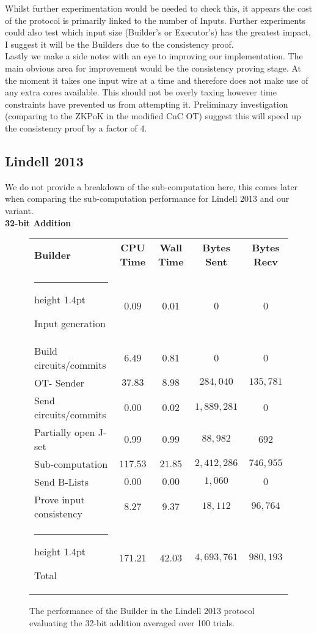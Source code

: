 \documentclass[11pt]{article} %
\makeatletter
\newcommand{\thickhline}{%
    \noalign {\ifnum 0=`}\fi \hrule height 1.4pt
    \futurelet \reserved@a \@xhline
}
\makeatother
\begin{document}
				Whilst further experimentation would be needed to check this, it appears the cost of the protocol is primarily linked to the number of Inputs. Further experiments could also test which input size (Builder's or Executor's) has the greatest impact, I suggest it will be the Builders due to the consistency proof.\\

				Lastly we make a side notes with an eye to improving our implementation. The main obvious area for improvement would be the consistency proving stage. At the moment it takes one input wire at a time and therefore does not make use of any extra cores available. This should not be overly taxing however time constraints have prevented us from attempting it. Preliminary investigation (comparing to the ZKPoK in the modified CnC OT) suggest this will speed up the consistency proof by a factor of 4.

			\pagebreak
			\subsection{Lindell 2013} \label{sub:L-2013_Results_Analysis}
				We do not provide a breakdown of the sub-computation here, this comes later when comparing the sub-computation performance for Lindell 2013 and our variant.\\

				\FloatBarrier
				\noindent \textbf{32-bit Addition}
				\begin{figure}[!ht]
					\begin{tabular}{| p{4.3cm} | c c c c |}
						\hline
						\textbf{Builder} & \textbf{CPU Time} & \textbf{Wall Time} & \textbf{Bytes Sent} & \textbf{Bytes Recv} \\
						\thickhline
						Input generation & $0.09$ & $0.01$ & $0$ & $0$ \\
						\hline
						Build circuits/commits & $6.49$ & $0.81$ & $0$ & $0$ \\
						\hline
						OT- Sender & $37.83$ & $8.98$ & $284,040$ & $135,781$ \\
						\hline
						Send circuits/commits & $0.00$ & $0.02$ & $1,889,281$ & $0$ \\
						\hline
						Partially open J-set & $0.99$ & $0.99$ & $88,982$ & $692$ \\
						\hline
						Sub-computation & $117.53$ & $21.85$ & $2,412,286$ & $746,955$ \\
						\hline
						Send B-Lists & $0.00$ & $0.00$ & $1,060$ & $0$ \\
						\hline
						Prove input consistency & $8.27$ & $9.37$ & $18,112$ & $96,764$ \\
						\thickhline
						Total & $171.21$ & $42.03$ & $4,693,761$ & $980,193$ \\
						\hline
					\end{tabular}
					\caption{The performance of the Builder in the Lindell 2013 protocol evaluating the 32-bit addition averaged over 100 trials. \label{table:L_2013_Add_Builder}}
				\end{figure}
\end{document}
